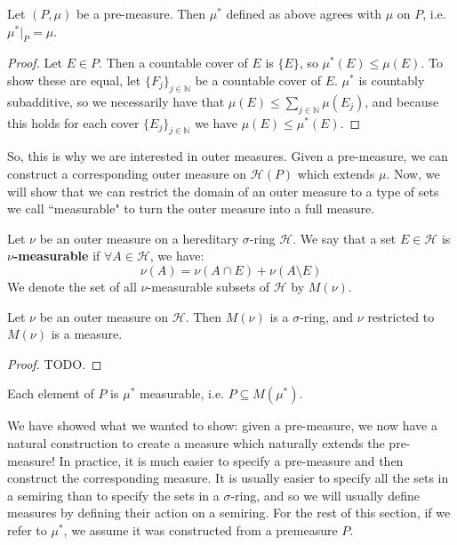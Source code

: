 	\begin{theorem}
		Let $(P, \mu)$ be a pre-measure. Then $\mu^*$ defined as above agrees with $\mu$ on $P$, i.e. $\mu^*|_P =\mu$.
	\end{theorem}
	
	\begin{proof}
		Let $E\in P$. Then a countable cover of $E$ is $\{E\}$, so $\mu^*(E)\leq\mu(E)$. To show these are equal, let 
		$\{F_j\}_{j\in\mathbb N}$ be a countable cover of $E$. $\mu^*$ is countably subadditive, so we necessarily have that 
		$\mu(E)\leq\sum_{j\in\mathbb N}\mu(E_j)$, and because this holds for each cover $\{E_j\}_{j\in\mathbb N}$ we have 
		$\mu(E)\leq\mu^*(E)$. 
	\end{proof}
	
	So, this is why we are interested in outer measures. Given a pre-measure, we can construct a corresponding outer 
	measure on $\mathcal H(P)$ which extends $\mu$. Now, we will show that we can restrict the domain of an outer 
	measure to a type of sets we call ``measurable" to turn the outer measure into a full measure.
	
	\begin{definition}[$\nu$-measurable]
		Let $\nu$ be an outer measure on a hereditary $\sigma$-ring $\mathcal H$. We say that a set $E\in\mathcal H$ is 
		\textbf{$\nu$-measurable} if $\forall A\in\mathcal H$, we have:
		$$
			\nu(A) = \nu(A\cap E) + \nu(A\setminus E)
		$$
		We denote the set of all $\nu$-measurable subsets of $\mathcal H$ by $M(\nu)$.
	\end{definition}
	
	\begin{theorem}
		Let $\nu$ be an outer measure on $\mathcal H$. Then $M(\nu)$ is a $\sigma$-ring, and $\nu$ restricted to $M(\nu)$ 
		is a 
		measure.
	\end{theorem}
	
	\begin{proof}
		TODO.
	\end{proof}
	
	\begin{prop}
		Each element of $P$ is $\mu^*$ measurable, i.e. $P\subseteq M(\mu^*)$. 
	\end{prop}
	
	We have showed what we wanted to show: given a pre-measure, we now have a natural construction to create a measure 
	which naturally extends the pre-measure! In practice, it is much easier to specify a pre-measure and then construct the 
	corresponding measure. It is usually easier to specify all the sets in a semiring than to specify the sets in a $\sigma$-ring, 
	and so we will usually define measures by defining their action on a semiring. For the rest of this section, if we refer to 
	$\mu^*$, we assume it was constructed from a premeasure $P$. 
	
